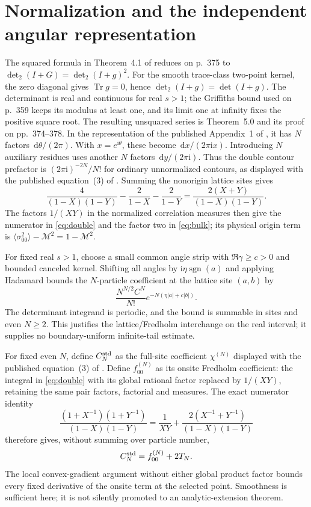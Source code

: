 \documentclass[11pt]{article}
\numberwithin{equation}{section}
\theoremstyle{definition}
\newcommand{\dd}{\,\mathrm d}
\newcommand{\ii}{\mathrm i}
\newcommand{\M}{\mathcal M}
\begin{document}


\section{Normalization and the independent angular representation}
\label{app:normalization}
The squared formula in Theorem~4.1 of \cite{PalmerTracy1981}
reduces on p.~375 to \(\det_2(I+G)=\det_2(I+g)^2\).
For the smooth trace-class two-point kernel, the zero diagonal gives
\(\operatorname{Tr}g=0\), hence \(\det_2(I+g)=\det(I+g)\).
The determinant is real and continuous for real \(s>1\);
the Griffiths bound used on p.~359 keeps its modulus at least one,
and its limit one at infinity fixes the positive square root.
The resulting unsquared series is Theorem~5.0 and its proof on
pp.~374--378. In the representation of the published Appendix~1
of \cite{TW2014}, it has
\(N\) factors \(\dd\theta/(2\pi)\).
With \(x=e^{\ii\theta}\), these become \(\dd x/(2\pi\ii x)\).
Introducing \(N\) auxiliary residues uses another \(N\) factors
\(\dd y/(2\pi\ii)\). Thus the double contour prefactor is
\((2\pi\ii)^{-2N}/N!\) for ordinary unnormalized contours,
as displayed with the published equation~(3) of \cite{TW2014}.
Summing the nonorigin lattice sites gives
\[
 \frac4{(1-X)(1-Y)}-\frac2{1-X}-\frac2{1-Y}
 =\frac{2(X+Y)}{(1-X)(1-Y)}.
\]
The factors \(1/(XY)\) in the normalized correlation measures
then give the numerator in \eqref{eq:double} and the factor two
in \eqref{eq:bulk}; its physical origin term is
\(\langle\sigma_{00}^2\rangle-\M^2=1-\M^2\).

For fixed real \(s>1\), choose a small common angle strip with
\(\Re\gamma\ge c>0\) and bounded canceled kernel. Shifting all angles
by \(\ii\eta\operatorname{sgn}(a)\) and applying Hadamard bounds the
\(N\)-particle coefficient at the lattice site \((a,b)\) by
\[
 \frac{N^{N/2}C^N}{N!}
 e^{-N(\eta|a|+c|b|)}.
\]
The determinant integrand is periodic, and the bound is summable in
sites and even \(N\ge2\). This justifies the lattice/Fredholm
interchange on the real interval; it supplies no boundary-uniform
infinite-tail estimate.

For fixed even \(N\), define \(C_N^{\rm std}\) as the full-site
coefficient \(\chi^{(N)}\) displayed with the published equation~(3)
of \cite{TW2014}. Define \(f_{00}^{(N)}\) as its onsite Fredholm
coefficient: the integral in \eqref{eq:double} with its global rational
factor replaced by \(1/(XY)\), retaining the same pair factors,
factorial and measures. The exact numerator identity
\[
 \frac{(1+X^{-1})(1+Y^{-1})}{(1-X)(1-Y)}
 =\frac1{XY}+\frac{2(X^{-1}+Y^{-1})}{(1-X)(1-Y)}
\]
therefore gives, without summing over particle number,
\[
 C_N^{\rm std}=f_{00}^{(N)}+2T_N.
\]
The local convex-gradient argument without either global product
factor bounds every fixed derivative of the onsite term at the
selected point. Smoothness is sufficient here; it is not silently
promoted to an analytic-extension theorem.
\end{document}
